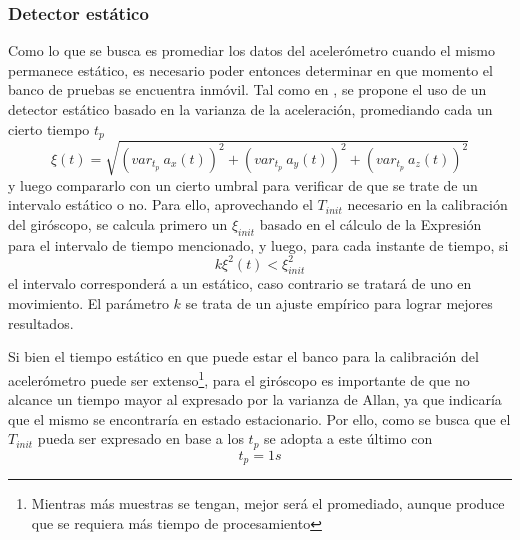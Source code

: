 \subsubsection{Detector estático}
Como lo que se busca es promediar los datos del acelerómetro cuando el mismo permanece estático, es necesario poder entonces determinar en que momento el banco de pruebas se encuentra inmóvil. Tal como en \cite{tedaldi2014}, se propone el uso de un detector estático basado en la varianza de la aceleración, promediando cada un cierto tiempo $t_p$
\begin{equation}
    \xi(t) = \sqrt{(var_{t_p}\ a_x(t))^2 + (var_{t_p}\ a_y(t))^2 + (var_{t_p}\ a_z(t))^2}
\end{equation}
y luego compararlo con un cierto umbral para verificar de que se trate de un intervalo estático o no. Para ello, aprovechando el $T_{init}$ necesario en la calibración del giróscopo, se calcula primero un $\xi_{init}$ basado en el cálculo de la Expresión para el intervalo de tiempo mencionado, y luego, para cada instante de tiempo, si
\begin{equation}
     k\xi^2(t) < \xi^2_{init}
\end{equation}
el intervalo corresponderá a un estático, caso contrario se tratará de uno en movimiento. El parámetro $k$ se trata de un ajuste empírico para lograr mejores resultados.

Si bien el tiempo estático en que puede estar el banco para la calibración del acelerómetro puede ser extenso\footnote{Mientras más muestras se tengan, mejor será el promediado, aunque produce que se requiera más tiempo de procesamiento}, para el giróscopo es importante de que no alcance un tiempo mayor al expresado por la varianza de Allan, ya que indicaría que el mismo se encontraría en estado estacionario. Por ello, como se busca que el $T_{init}$ pueda ser expresado en base a los $t_p$ se adopta a este último con
\begin{equation}
    t_p = 1 s
\end{equation}

